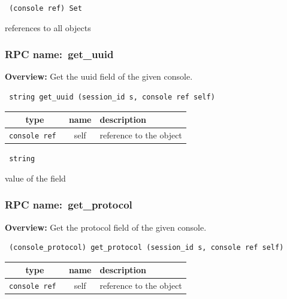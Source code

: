 \vspace{0.3cm}

{\tt 
(console ref) Set
}


references to all objects
\vspace{0.3cm}
\vspace{0.3cm}
\vspace{0.3cm}
\subsubsection{RPC name:~get\_uuid}

{\bf Overview:} 
Get the uuid field of the given console.

\begin{verbatim} string get_uuid (session_id s, console ref self)\end{verbatim}



 
\vspace{0.3cm}
\begin{tabular}{|c|c|p{7cm}|}
 \hline
{\bf type} & {\bf name} & {\bf description} \\ \hline
{\tt console ref } & self & reference to the object \\ \hline 

\end{tabular}

\vspace{0.3cm}

{\tt 
string
}


value of the field
\vspace{0.3cm}
\vspace{0.3cm}
\vspace{0.3cm}
\subsubsection{RPC name:~get\_protocol}

{\bf Overview:} 
Get the protocol field of the given console.

\begin{verbatim} (console_protocol) get_protocol (session_id s, console ref self)\end{verbatim}



 
\vspace{0.3cm}
\begin{tabular}{|c|c|p{7cm}|}
 \hline
{\bf type} & {\bf name} & {\bf description} \\ \hline
{\tt console ref } & self & reference to the object \\ \hline 

\end{tabular}

